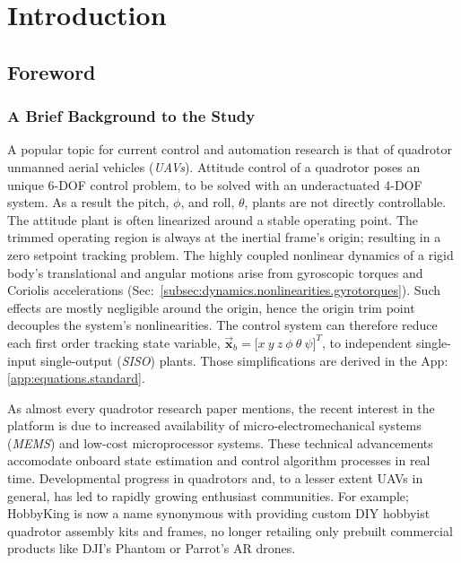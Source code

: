 \chapter{Introduction}
\label{ch:intro}
\section{Foreword}
\label{sec:intro.foreword}
\subsection{A Brief Background to the Study}
\label{subsec:intro.foreword.background}
A popular topic for current control and automation research is that of quadrotor unmanned aerial vehicles (\emph{UAVs}). Attitude control of a quadrotor poses an unique 6-DOF control problem, to be solved with an underactuated 4-DOF system. As a result the pitch, $\phi$, and roll, $\theta$, plants are not directly controllable. The attitude plant is often linearized around a stable operating point. The trimmed operating region is always at the inertial frame's origin; resulting in a zero setpoint tracking problem. The highly coupled nonlinear dynamics of a rigid body's translational and angular motions arise from gyroscopic torques and Coriolis accelerations (Sec:~\ref{subsec:dynamics.nonlinearities.gyrotorques}). Such effects are mostly negligible around the origin, hence the origin trim point decouples the system's nonlinearities. The control system can therefore reduce each first order tracking state variable, $\vec{\mathbf{x}}_b=\big[x~y~z~\phi~\theta~\psi\big]^T$, to independent single-input single-output (\emph{SISO}) plants. Those simplifications are derived in the App:\ref{app:equations.standard}.
\par
As almost every quadrotor research paper mentions, the recent interest in the platform is due to increased availability of micro-electromechanical systems (\emph{MEMS}) and low-cost microprocessor systems. These technical advancements accomodate onboard state estimation and control algorithm processes in real time. Developmental progress in quadrotors and, to a lesser extent UAVs in general, has led to rapidly growing enthusiast communities. For example; HobbyKing\cite{hobbyking} is now a name synonymous with providing custom DIY hobbyist quadrotor assembly kits and frames, no longer retailing only prebuilt commercial products like DJI's Phantom\cite{phantom} or Parrot's AR\cite{parrotar} drones.
